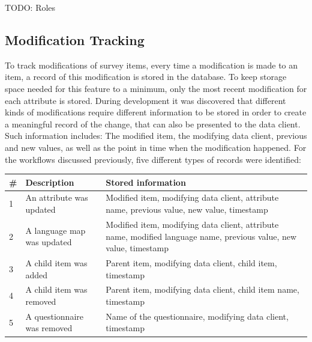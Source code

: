 \documentclass[a4paper,11pt]{article}
\begin{document}
                TODO: Roles

            \subsection{Modification Tracking}
                To track modifications of survey items, every time a modification
                is made to an item, a record of this modification is stored in the
                database. To keep storage space needed for this feature to a minimum,
                only the most recent modification for each attribute is stored.
                During development it was discovered that different kinds of modifications
                require different information to be stored in order to create a meaningful
                record of the change, that can also be presented to the data client.
                Such information includes: The modified item, the modifying data client,
                previous and new values, as well as the point in time when the modification
                happened. For the workflows discussed previously, five different types
                of records were identified:

                \begin{table}[H]
                    \begin{tabularx}{\textwidth}{|l|l|X|}
                        \hline
                        \# & Description & Stored information \\
                        \hline \hline
                        1 & An attribute was updated  & Modified item, modifying data client, attribute name, previous value, new value, timestamp \\
                        2 & A language map was updated & Modified item, modifying data client, attribute name, modified language name, previous value, new value, timestamp \\
                        \hline
                        3 & A child item was added & Parent item, modifying data client, child item, timestamp \\
                        4 & A child item was removed & Parent item, modifying data client, child item name, timestamp \\
                        \hline
                        5 & A questionnaire was removed & Name of the questionnaire, modifying data client, timestamp\\
                        \hline
                    \end{tabularx}
                \end{table}
\end{document}
